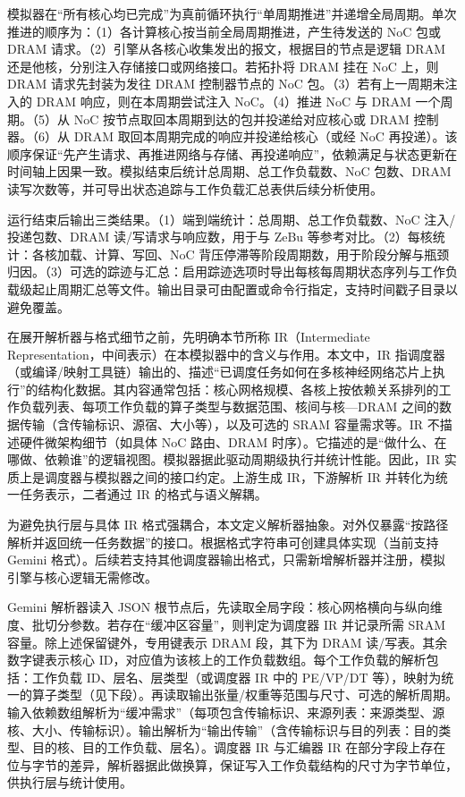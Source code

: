 模拟器在“所有核心均已完成”为真前循环执行“单周期推进”并递增全局周期。单次推进的顺序为：（1）各计算核心按当前全局周期推进，产生待发送的 NoC 包或 DRAM 请求。（2）引擎从各核心收集发出的报文，根据目的节点是逻辑 DRAM 还是他核，分别注入存储接口或网络接口。若拓扑将 DRAM 挂在 NoC 上，则 DRAM 请求先封装为发往 DRAM 控制器节点的 NoC 包。（3）若有上一周期未注入的 DRAM 响应，则在本周期尝试注入 NoC。（4）推进 NoC 与 DRAM 一个周期。（5）从 NoC 按节点取回本周期到达的包并投递给对应核心或 DRAM 控制器。（6）从 DRAM 取回本周期完成的响应并投递给核心（或经 NoC 再投递）。该顺序保证“先产生请求、再推进网络与存储、再投递响应”，依赖满足与状态更新在时间轴上因果一致。模拟结束后统计总周期、总工作负载数、NoC 包数、DRAM 读写次数等，并可导出状态追踪与工作负载汇总表供后续分析使用。

运行结束后输出三类结果。（1）端到端统计：总周期、总工作负载数、NoC 注入/投递包数、DRAM 读/写请求与响应数，用于与 ZeBu 等参考对比。（2）每核统计：各核加载、计算、写回、NoC 背压停滞等阶段周期数，用于阶段分解与瓶颈归因。（3）可选的踪迹与汇总：启用踪迹选项时导出每核每周期状态序列与工作负载级起止周期汇总等文件。输出目录可由配置或命令行指定，支持时间戳子目录以避免覆盖。



在展开解析器与格式细节之前，先明确本节所称 IR（Intermediate Representation，中间表示）在本模拟器中的含义与作用。本文中，IR 指调度器（或编译/映射工具链）输出的、描述“已调度任务如何在多核神经网络芯片上执行”的结构化数据。其内容通常包括：核心网格规模、各核上按依赖关系排列的工作负载列表、每项工作负载的算子类型与数据范围、核间与核—DRAM 之间的数据传输（含传输标识、源宿、大小等），以及可选的 SRAM 容量需求等。IR 不描述硬件微架构细节（如具体 NoC 路由、DRAM 时序）。它描述的是“做什么、在哪做、依赖谁”的逻辑视图。模拟器据此驱动周期级执行并统计性能。因此，IR 实质上是调度器与模拟器之间的接口约定。上游生成 IR，下游解析 IR 并转化为统一任务表示，二者通过 IR 的格式与语义解耦。


为避免执行层与具体 IR 格式强耦合，本文定义解析器抽象。对外仅暴露“按路径解析并返回统一任务数据”的接口。根据格式字符串可创建具体实现（当前支持 Gemini 格式）。后续若支持其他调度器输出格式，只需新增解析器并注册，模拟引擎与核心逻辑无需修改。

Gemini 解析器读入 JSON 根节点后，先读取全局字段：核心网格横向与纵向维度、批切分参数。若存在“缓冲区容量”，则判定为调度器 IR 并记录所需 SRAM 容量。除上述保留键外，专用键表示 DRAM 段，其下为 DRAM 读/写表。其余数字键表示核心 ID，对应值为该核上的工作负载数组。每个工作负载的解析包括：工作负载 ID、层名、层类型（或调度器 IR 中的 PE/VP/DT 等），映射为统一的算子类型（见下段）。再读取输出张量/权重等范围与尺寸、可选的解析周期。输入依赖数组解析为“缓冲需求”（每项包含传输标识、来源列表：来源类型、源核、大小、传输标识）。输出解析为“输出传输”（含传输标识与目的列表：目的类型、目的核、目的工作负载、层名）。调度器 IR 与汇编器 IR 在部分字段上存在位与字节的差异，解析器据此做换算，保证写入工作负载结构的尺寸为字节单位，供执行层与统计使用。

